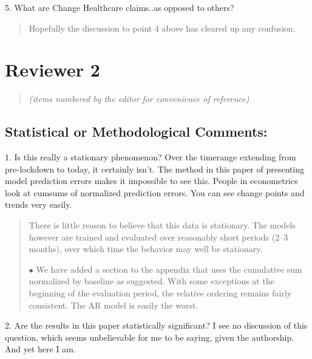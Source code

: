 \documentclass[11pt]{article}
\newenvironment{resp}{\begin{quote}\color{cobalt}}{\end{quote}}
\begin{document}
  5. What are Change Healthcare claims..as opposed to others?


\begin{resp}
  Hopefully the discussion to point 4 above has cleared up any confusion.
\end{resp}


\section*{Reviewer 2}
\begin{quote}
  \emph{(items numbered by the editor for convenience of reference)}
\end{quote}

\subsection*{Statistical or Methodological Comments:}
  
1. Is this really a stationary phenomenon? Over the timerange extending from
pre-lockdown to today, it certainly isn't. The method in this paper of
presenting model prediction errors makes it impossible to see this. People in
econometrics look at cumsums of normalized prediction errors. You can see change
points and trends very easily.

\begin{resp}
  There is little reason to believe that this data is stationary. The models
  however are trained and evaluated over reasonably short periods (2--3 months),
  over which time the behavior may well be stationary.

  $\bullet$ We have added a section
  to the appendix that uses the cumulative sum normalized by baseline as
  suggested. With some exceptions at the beginning of 
  the evaluation period, the relative ordering remains fairly consistent. The AR
  model is easily the worst.

\end{resp}

2. Are the results in this paper statistically significant? I see no discussion
of this question, which seems unbelievable for me to be saying, given the
authorship. And yet here I am.
\end{document}
